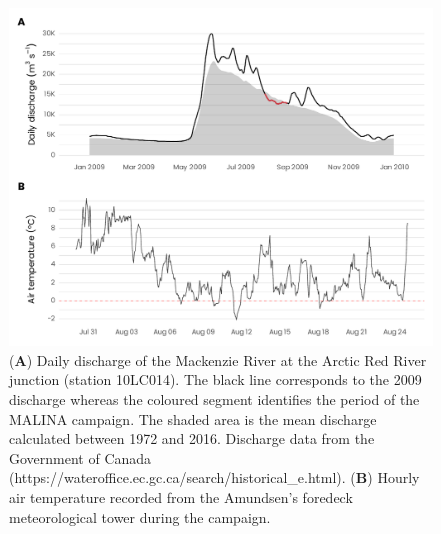 \documentclass[essd, manuscript]{copernicus}
\begin{document}
\clearpage

\begin{figure}[H]
    \centering
    \includegraphics[scale = 1]{../../../graphs/fig03.pdf}
    \caption{(\textbf{A}) Daily discharge of the Mackenzie River at the Arctic Red River junction (station 10LC014). The black line corresponds to the 2009 discharge whereas the coloured segment identifies the period of the MALINA campaign. The shaded area is the mean discharge calculated between 1972 and 2016. Discharge data from the Government of Canada (https://wateroffice.ec.gc.ca/search/historical\_e.html). (\textbf{B}) Hourly air temperature recorded from the Amundsen's foredeck meteorological tower during the campaign.}
\end{figure}

\clearpage
\end{document}
